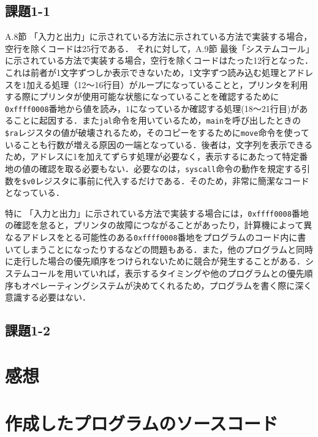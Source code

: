 \subsection{課題1-1}
A.8節 「入力と出力」に示されている方法に示されている方法で実装する場合，空行を除くコードは25行である．
それに対して，A.9節 最後「システムコール」に示されている方法で実装する場合，空行を除くコードはたった12行となった．
これは前者が1文字ずつしか表示できないため，1文字ずつ読み込む処理とアドレスを$1$加える処理（12～16行目）がループになっていることと，プリンタを利用する際にプリンタが使用可能な状態になっていることを確認するために\verb|0xffff0008|番地から値を読み，$1$になっているか確認する処理(18～21行目)があることに起因する．また\verb|jal|命令を用いているため，\verb|main|を呼び出したときの\verb|$ra|レジスタの値が破壊されるため，そのコピーをするために\verb|move|命令を使っていることも行数が増える原因の一端となっている．後者は，文字列を表示できるため，アドレスに1を加えてずらす処理が必要なく，表示するにあたって特定番地の値の確認を取る必要もない．必要なのは，\verb|syscall|命令の動作を規定する引数を\verb|$v0|レジスタに事前に代入するだけである．そのため，非常に簡潔なコードとなっている．

特に 「入力と出力」に示されている方法で実装する場合には，\verb|0xffff0008|番地の確認を怠ると，プリンタの故障につながることがあったり，計算機によって異なるアドレスをとる可能性のある\verb|0xffff0008|番地をプログラムのコード内に書いてしまうことになったりするなどの問題もある．また，他のプログラムと同時に走行した場合の優先順序をつけられないために競合が発生することがある．システムコールを用いていれば，表示するタイミングや他のプログラムとの優先順序もオペレーティングシステムが決めてくれるため，プログラムを書く際に深く意識する必要はない．

\subsection{課題1-2}


\section{感想} \label{sec:review}


\section{作成したプログラムのソースコード} \label{sec:makep}

